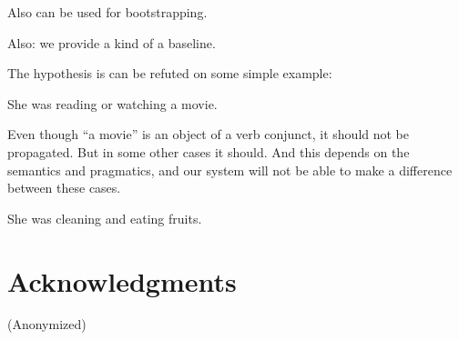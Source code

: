 \documentclass[11pt,a4paper]{article}
\begin{document}
Also can be used for bootstrapping.

Also: we provide a kind of a baseline.

The hypothesis is can be refuted on some simple example:

She was reading or watching a movie.

Even though ``a movie'' is an object of a verb conjunct, it should not
be propagated. But in some other cases it should. And this depends on
the semantics and pragmatics, and our system will not be able to make
a difference between these cases.

She was cleaning and eating fruits.

\section*{Acknowledgments}

(Anonymized)



\end{document}
